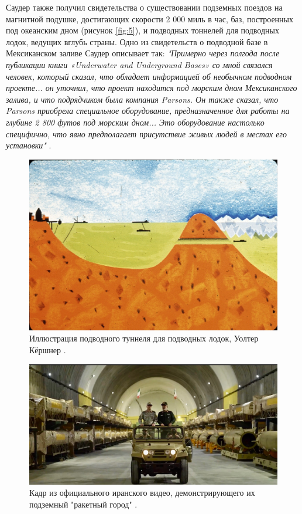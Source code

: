\documentclass[10pt,twocolumn,letterpaper]{article}
\begin{document}
Саудер также получил свидетельства о существовании подземных поездов на магнитной подушке, достигающих скорости 2 000 миль в час, баз, построенных под океанским дном (рисунок \ref{fig:5}), и подводных тоннелей для подводных лодок, ведущих вглубь страны. Одно из свидетельств о подводной базе в Мексиканском заливе Саудер описывает так: \textit{"Примерно через полгода после публикации книги «Underwater and Underground Bases» со мной связался человек, который сказал, что обладает информацией об необычном подводном проекте... он уточнил, что проект находится под морским дном Мексиканского залива, и что подрядчиком была компания Parsons. Он также сказал, что Parsons приобрела специальное оборудование, предназначенное для работы на глубине 2 800 футов под морским дном... Это оборудование настолько специфично, что явно предполагает присутствие живых людей в местах его установки"} \cite{22}.
\begin{figure}[t]
\begin{center}
   \includegraphics[width=1\linewidth]{sub.jpg}
\end{center}
   \caption{Иллюстрация подводного туннеля для подводных лодок, Уолтер Кёршнер \cite{22,23}.}
\label{fig:6}
\label{fig:onecol}
\end{figure}

\begin{figure}[t]
\begin{center}
   \includegraphics[width=1\linewidth]{iran.jpeg}
\end{center}
   \caption{Кадр из официального иранского видео, демонстрирующего их подземный "ракетный город" \cite{39,40}.}
\label{fig:12}
\label{fig:onecol}
\end{figure}
\end{document}
